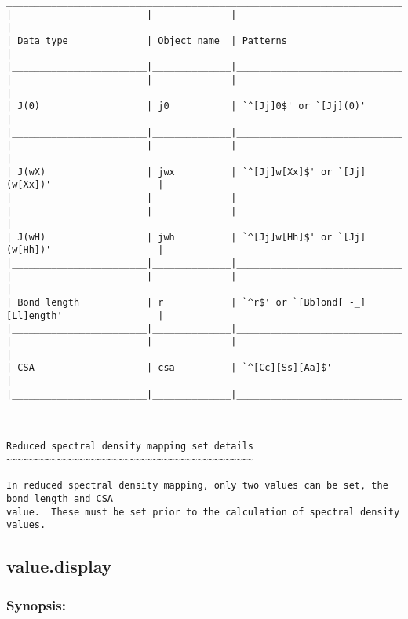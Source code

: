 {\begin{verbatim}
____________________________________________________________________________________________
|                        |              |                                                  |
| Data type              | Object name  | Patterns                                         |
|________________________|______________|__________________________________________________|
|                        |              |                                                  |
| J(0)                   | j0           | `^[Jj]0$' or `[Jj](0)'                           |
|________________________|______________|__________________________________________________|
|                        |              |                                                  |
| J(wX)                  | jwx          | `^[Jj]w[Xx]$' or `[Jj](w[Xx])'                   |
|________________________|______________|__________________________________________________|
|                        |              |                                                  |
| J(wH)                  | jwh          | `^[Jj]w[Hh]$' or `[Jj](w[Hh])'                   |
|________________________|______________|__________________________________________________|
|                        |              |                                                  |
| Bond length            | r            | `^r$' or `[Bb]ond[ -_][Ll]ength'                 |
|________________________|______________|__________________________________________________|
|                        |              |                                                  |
| CSA                    | csa          | `^[Cc][Ss][Aa]$'                                 |
|________________________|______________|__________________________________________________|



Reduced spectral density mapping set details
~~~~~~~~~~~~~~~~~~~~~~~~~~~~~~~~~~~~~~~~~~~~

In reduced spectral density mapping, only two values can be set, the bond length and CSA
value.  These must be set prior to the calculation of spectral density values.
\end{verbatim}
}



\newpage

\subsection{value.display}


\subsubsection{Synopsis:}

